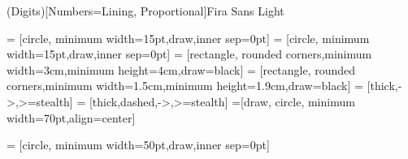 

\linespread{1.5}

\usepackage{graphicx}
\usepackage{booktabs}
\usepackage{amssymb}
\usepackage{pifont}
\usepackage{textcomp}
\usepackage{xcolor}
\usepackage{url}
\usepackage{xspace}
\usepackage{amsmath}
\usepackage{mathspec}
\usepackage[font=footnotesize]{caption}
\usepackage{subcaption}
\setsansfont[BoldFont={Fira Sans}, Numbers={OldStyle}]{Fira Sans Light}
\setmathsfont(Digits)[Numbers={Lining, Proportional}]{Fira Sans Light}


\newcommand{\tDelta}{\textsf{Delta}\xspace}

\usetikzlibrary{shapes.geometric, arrows}
\usetikzlibrary{arrows, positioning, shapes}
\usetikzlibrary{decorations.pathmorphing}
\usetikzlibrary{calc}
 = [circle, minimum width=15pt,draw,inner sep=0pt]
 = [circle, minimum width=15pt,draw,inner sep=0pt]
 = [rectangle, rounded corners,minimum width=3cm,minimum height=4cm,draw=black]
 = [rectangle, rounded corners,minimum width=1.5cm,minimum height=1.9cm,draw=black]
 = [thick,->,>=stealth]
 = [thick,dashed,->,>=stealth]
=[draw, circle, minimum width=70pt,align=center]

 = [circle, minimum width=50pt,draw,inner sep=0pt]

